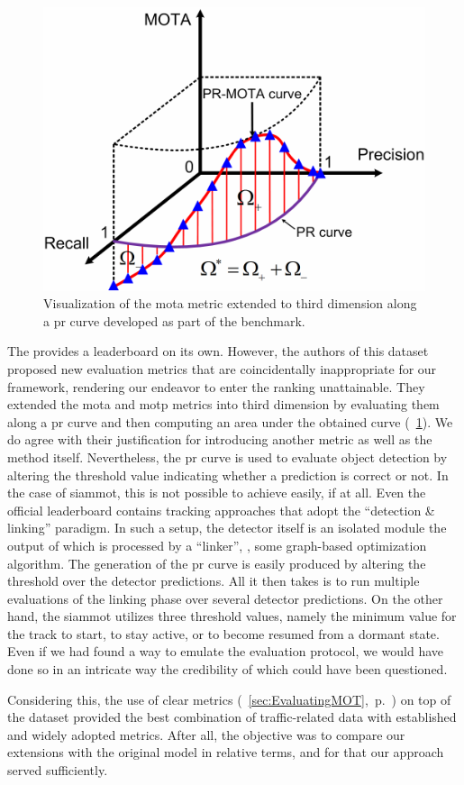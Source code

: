 \begin{figure}[t]
    \centerline{\includegraphics[width=0.5\linewidth]{figures/siamese_tracking/pr_mota_curve.pdf}}
    \caption[PR-\gls{mota} visualization]{Visualization of the \gls{mota} metric extended to third dimension along a \gls{pr} curve developed as part of the \uadetrac{} benchmark. }
    \label{fig:PRMOTAVisualization}
\end{figure}

The \uadetrac{} provides a leaderboard on its own. However, the authors of this dataset proposed new evaluation metrics that are coincidentally inappropriate for our framework, rendering our endeavor to enter the ranking unattainable. They extended the \gls{mota} and \gls{motp} metrics into third dimension by evaluating them along a \gls{pr} curve and then computing an area under the obtained curve (\figtext{}~\ref{fig:PRMOTAVisualization}). We do agree with their justification for introducing another metric as well as the method itself. Nevertheless, the \gls{pr} curve is used to evaluate object detection by altering the threshold value indicating whether a prediction is correct or not. In the case of \gls{siammot}, this is not possible to achieve easily, if at all. Even the official \uadetrac{} leaderboard contains tracking approaches that adopt the ``detection \& linking'' paradigm. In such a setup, the detector itself is an isolated module the output of which is processed by a ``linker'', \egtext{}, some graph-based optimization algorithm. The generation of the \gls{pr} curve is easily produced by altering the threshold over the detector predictions. All it then takes is to run multiple evaluations of the linking phase over several detector predictions. On the other hand, the \gls{siammot} utilizes three threshold values, namely the minimum value for the track to start, to stay active, or to become resumed from a dormant state. Even if we had found a way to emulate the evaluation protocol, we would have done so in an intricate way the credibility of which could have been questioned.

Considering this, the use of \gls{clear} metrics (\sectiontext{}~\ref{sec:EvaluatingMOT},~p.~\pageref{sec:EvaluatingMOT}) on top of the \uadetrac{} dataset provided the best combination of traffic-related data with established and widely adopted metrics. After all, the objective was to compare our extensions with the original model in relative terms, and for that our approach served sufficiently.
